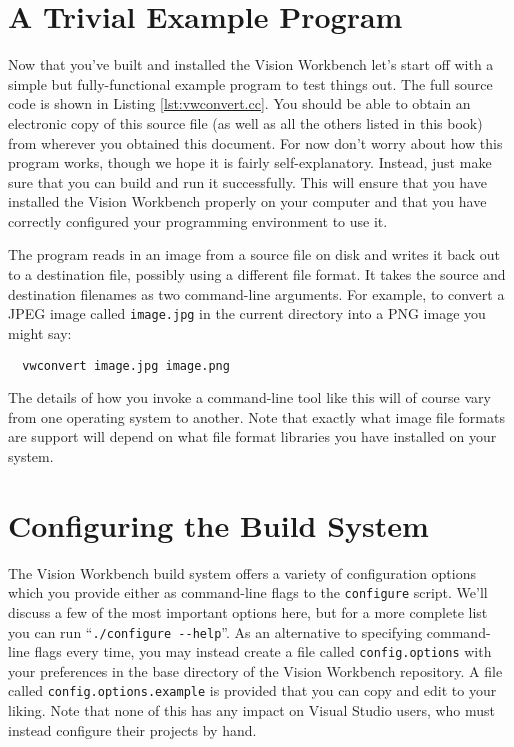 \section{A Trivial Example Program}

Now that you've built and installed the Vision Workbench let's start
off with a simple but fully-functional example program to test things
out.  The full source code is shown in Listing \ref{lst:vwconvert.cc}.
You should be able to obtain an electronic copy of this source file
(as well as all the others listed in this book) from wherever you
obtained this document.  For now don't worry about how this program
works, though we hope it is fairly self-explanatory.  Instead, just
make sure that you can build and run it successfully.  This will
ensure that you have installed the Vision Workbench properly on your
computer and that you have correctly configured your programming
environment to use it.


The program reads in an image from a source file on disk and writes it 
back out to a destination file, possibly using a different file format.  
It takes the source and destination filenames as two command-line arguments.  
For example, to convert a JPEG image called \verb#image.jpg# in the current 
directory into a PNG image you might say:
\begin{verbatim}
  vwconvert image.jpg image.png
\end{verbatim}
The details of how you invoke a command-line tool like this will of 
course vary from one operating system to another.  Note that exactly 
what image file formats are support will depend on what file format 
libraries you have installed on your system.

\section{Configuring the Build System}\label{sec:config-build}

The Vision Workbench build system offers a variety of configuration
options which you provide either as command-line flags to the 
\verb#configure# script.  We'll discuss a few of the most important
options here, but for a more complete list you can run ``\verb#./configure --help#''.  
As an alternative to specifying command-line flags every time, you may
instead create a file called \verb#config.options# with your preferences 
in the base directory of the Vision Workbench repository.  A file
called \verb#config.options.example# is provided that you can copy and
edit to your liking.  Note that none of this has any impact on Visual
Studio users, who must instead configure their projects by hand.

